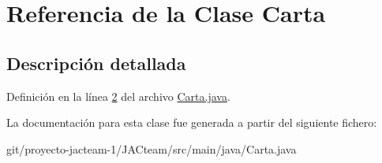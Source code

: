 \hypertarget{class_carta}{}\section{Referencia de la Clase Carta}
\label{class_carta}


\subsection{Descripción detallada}


Definición en la línea \mbox{\hyperlink{_carta_8java_source_l00002}{2}} del archivo \mbox{\hyperlink{_carta_8java_source}{Carta.\+java}}.



La documentación para esta clase fue generada a partir del siguiente fichero\+:\begin{DoxyCompactItemize}
\item 
git/proyecto-\/jacteam-\/1/\+J\+A\+Cteam/src/main/java/Carta.\+java\end{DoxyCompactItemize}

